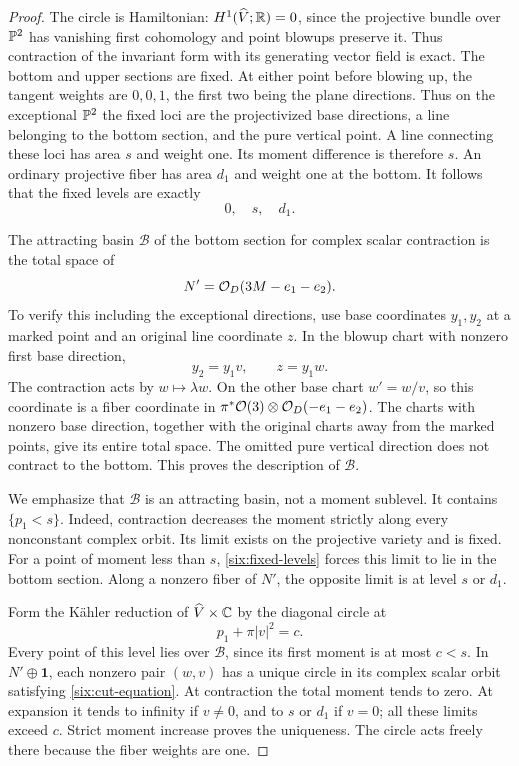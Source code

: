 \begin{proof}
The circle is Hamiltonian: \(H^1(\widehat V;\mathbb R)=0\), since the
projective bundle over \(\mathbb P^2\) has vanishing first cohomology
and point blowups preserve it.  Thus contraction
of the invariant form with its generating vector field is exact.
The bottom and upper sections are fixed.  At either point before
blowing up, the tangent weights are \(0,0,1\), the first two being
the plane directions.  Thus on the exceptional \(\mathbb P^2\) the fixed
loci are the projectivized base directions, a line belonging to
the bottom section, and the pure vertical point.  A line connecting
these loci has area \(s\) and weight one.  Its moment difference
is therefore \(s\).  An ordinary projective fiber has area \(d_1\)
and weight one at the bottom.  It follows that the fixed levels
are exactly
\begin{equation}\label{six:fixed-levels}
 0,\quad s,\quad d_1.
\end{equation}

The attracting basin \(\mathcal B\) of the bottom section for
complex scalar contraction is the total space of
\[
 N'=\mathcal O_D(3M-e_1-e_2).
\]
To verify this including the exceptional directions, use base
coordinates \(y_1,y_2\) at a marked point and an original line
coordinate \(z\).  In the blowup chart with nonzero first base
direction,
\[
 y_2=y_1v,\qquad z=y_1w.
\]
The contraction acts by \(w\mapsto\lambda w\).  On the other base
chart \(w'=w/v\), so this coordinate is a fiber coordinate in
\(\pi^*\mathcal O(3)\otimes\mathcal O_D(-e_1-e_2)\).
The charts with nonzero base direction, together with the original
charts away from the marked points, give its entire total space.
The omitted pure vertical direction does not contract to the
bottom.  This proves the description of \(\mathcal B\).

We emphasize that \(\mathcal B\) is an attracting basin, not a
moment sublevel.  It contains \(\{p_1<s\}\).  Indeed, contraction
decreases the moment strictly along every nonconstant complex
orbit.  Its limit exists on the projective variety and is fixed.
For a point of moment less than \(s\), \eqref{six:fixed-levels}
forces this limit to lie in the bottom section.  Along a nonzero
fiber of \(N'\), the opposite limit is at level \(s\) or \(d_1\).

Form the Kähler reduction of \(\widehat V\times\mathbb C\) by the diagonal
circle at
\begin{equation}\label{six:cut-equation}
 p_1+\pi|v|^2=c.
\end{equation}
Every point of this level lies over \(\mathcal B\), since its
first moment is at most \(c<s\).  In
\(N'\oplus\mathbf1\), each nonzero pair \((w,v)\) has a unique
circle in its complex scalar orbit satisfying
\eqref{six:cut-equation}.  At contraction the total moment tends
to zero.  At expansion it tends to infinity if \(v\ne0\), and
to \(s\) or \(d_1\) if \(v=0\); all these limits exceed \(c\).
Strict moment increase proves the uniqueness.  The circle acts
freely there because the fiber weights are one.


\end{proof}
